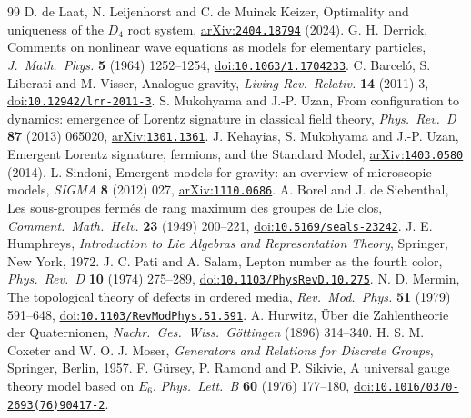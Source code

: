 \documentclass[a4paper,11pt]{article}
\numberwithin{equation}{section}
\theoremstyle{jsplain}
\theoremstyle{jsrem}
\begin{document}
\begin{thebibliography}{99}
 D. de Laat, N. Leijenhorst and C. de Muinck Keizer, Optimality and uniqueness of the $D_4$ root system, \href{https://arxiv.org/abs/2404.18794}{arXiv:\nolinkurl{2404.18794}} (2024).
 G. H. Derrick, Comments on nonlinear wave equations as models for elementary particles, \textit{J.\ Math.\ Phys.} \textbf{5} (1964) 1252--1254, \href{https://doi.org/10.1063/1.1704233}{doi:\nolinkurl{10.1063/1.1704233}}.
 C. Barceló, S. Liberati and M. Visser, Analogue gravity, \textit{Living Rev.\ Relativ.} \textbf{14} (2011) 3, \href{https://doi.org/10.12942/lrr-2011-3}{doi:\nolinkurl{10.12942/lrr-2011-3}}.
 S. Mukohyama and J.-P. Uzan, From configuration to dynamics: emergence of Lorentz signature in classical field theory, \textit{Phys.\ Rev.\ D} \textbf{87} (2013) 065020, \href{https://arxiv.org/abs/1301.1361}{arXiv:\nolinkurl{1301.1361}}.
 J. Kehayias, S. Mukohyama and J.-P. Uzan, Emergent Lorentz signature, fermions, and the Standard Model, \href{https://arxiv.org/abs/1403.0580}{arXiv:\nolinkurl{1403.0580}} (2014).
 L. Sindoni, Emergent models for gravity: an overview of microscopic models, \textit{SIGMA} \textbf{8} (2012) 027, \href{https://arxiv.org/abs/1110.0686}{arXiv:\nolinkurl{1110.0686}}.
 A. Borel and J. de Siebenthal, Les sous-groupes fermés de rang maximum des groupes de Lie clos, \textit{Comment.\ Math.\ Helv.} \textbf{23} (1949) 200--221, \href{https://doi.org/10.5169/seals-23242}{doi:\nolinkurl{10.5169/seals-23242}}.
 J. E. Humphreys, \textit{Introduction to Lie Algebras and Representation Theory}, Springer, New York, 1972.
 J. C. Pati and A. Salam, Lepton number as the fourth color, \textit{Phys.\ Rev.\ D} \textbf{10} (1974) 275--289, \href{https://doi.org/10.1103/PhysRevD.10.275}{doi:\nolinkurl{10.1103/PhysRevD.10.275}}.
 N. D. Mermin, The topological theory of defects in ordered media, \textit{Rev.\ Mod.\ Phys.} \textbf{51} (1979) 591--648, \href{https://doi.org/10.1103/RevModPhys.51.591}{doi:\nolinkurl{10.1103/RevModPhys.51.591}}.
 A. Hurwitz, Über die Zahlentheorie der Quaternionen, \textit{Nachr.\ Ges.\ Wiss.\ Göttingen} (1896) 314--340.
 H. S. M. Coxeter and W. O. J. Moser, \textit{Generators and Relations for Discrete Groups}, Springer, Berlin, 1957.
 F. Gürsey, P. Ramond and P. Sikivie, A universal gauge theory model based on $E_6$, \textit{Phys.\ Lett.\ B} \textbf{60} (1976) 177--180, \href{https://doi.org/10.1016/0370-2693(76)90417-2}{doi:\nolinkurl{10.1016/0370-2693(76)90417-2}}.

\end{thebibliography}
\end{document}
